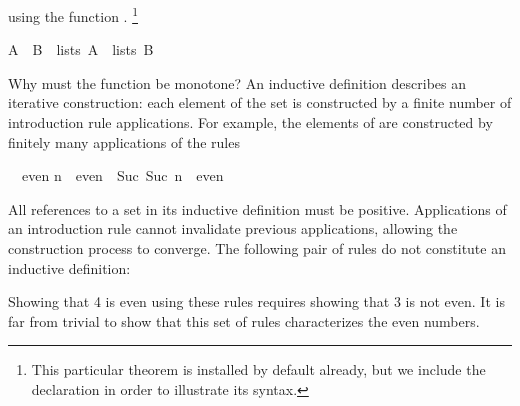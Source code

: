 \begin{isabellebody}
\begin{isamarkuptext}
using the function .%
\footnote{This particular theorem is installed by default already, but we
include the  declaration in order to illustrate its syntax.}
\begin{isabelle}%
A\ {}\ B\ {}\ lists\ A\ {}\ lists\ B%
\end{isabelle}
Why must the function be monotone?  An inductive definition describes
an iterative construction: each element of the set is constructed by a
finite number of introduction rule applications.  For example, the
elements of  are constructed by finitely many applications of
the rules
\begin{isabelle}%
{}\ {}\ even\isasep\isanewline%
n\ {}\ even\ {}\ Suc\ {}Suc\ n{}\ {}\ even%
\end{isabelle}
All references to a set in its
inductive definition must be positive.  Applications of an
introduction rule cannot invalidate previous applications, allowing the
construction process to converge.
The following pair of rules do not constitute an inductive definition:
\begin{trivlist}
\item {}
\item {}
\end{trivlist}
Showing that 4 is even using these rules requires showing that 3 is not
even.  It is far from trivial to show that this set of rules
characterizes the even numbers.  


\end{isamarkuptext}
\end{isabellebody}
